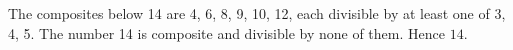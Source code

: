 The composites below 14 are 4, 6, 8, 9, 10, 12, each divisible by at least one of 3, 4, 5. The number 14 is composite and divisible by none of them. Hence $\boxed{14}$.
